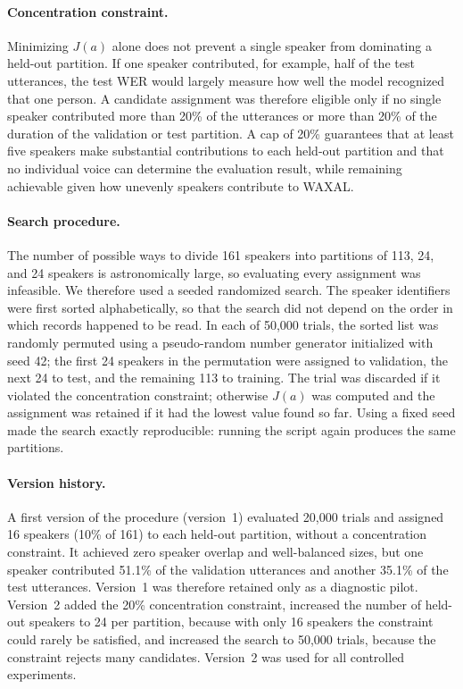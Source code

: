 \paragraph{Concentration constraint.}
Minimizing $J(a)$ alone does not prevent a single speaker from dominating a
held-out partition. If one speaker contributed, for example, half of the test
utterances, the test WER would largely measure how well the model recognized that
one person. A candidate assignment was therefore eligible only if no single
speaker contributed more than 20\% of the utterances or more than 20\% of the
duration of the validation or test partition. A cap of 20\% guarantees that at
least five speakers make substantial contributions to each held-out partition and
that no individual voice can determine the evaluation result, while remaining
achievable given how unevenly speakers contribute to WAXAL.

\paragraph{Search procedure.}
The number of possible ways to divide 161 speakers into partitions of 113, 24, and
24 speakers is astronomically large, so evaluating every assignment was
infeasible. We therefore used a seeded randomized search. The speaker identifiers
were first sorted alphabetically, so that the search did not depend on the order in
which records happened to be read. In each of 50,000 trials, the sorted list was
randomly permuted using a pseudo-random number generator initialized with seed
42; the first 24 speakers in the permutation were assigned to validation, the next
24 to test, and the remaining 113 to training. The trial was discarded if it
violated the concentration constraint; otherwise $J(a)$ was computed and the
assignment was retained if it had the lowest value found so far. Using a fixed
seed made the search exactly reproducible: running the script again produces the
same partitions.

\paragraph{Version history.}
A first version of the procedure (version~1) evaluated 20,000 trials and assigned
16 speakers (10\% of 161) to each held-out partition, without a concentration
constraint. It achieved zero speaker overlap and well-balanced sizes, but one
speaker contributed 51.1\% of the validation utterances and another 35.1\% of the
test utterances. Version~1 was therefore retained only as a diagnostic pilot.
Version~2 added the 20\% concentration constraint, increased the number of
held-out speakers to 24 per partition, because with only 16 speakers the
constraint could rarely be satisfied, and increased the search to 50,000 trials,
because the constraint rejects many candidates. Version~2 was used for all
controlled experiments.

